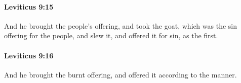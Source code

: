 		\paragraph{Leviticus 9:15} %
			\label{LEVITICUS-9-15}

			And he brought the people’s offering, and took the goat, which was the sin offering for the people, and slew it, and offered it for sin, as the first.


		\paragraph{Leviticus 9:16} %
			\label{LEVITICUS-9-16}

			And he brought the burnt offering, and offered it according to the manner.


